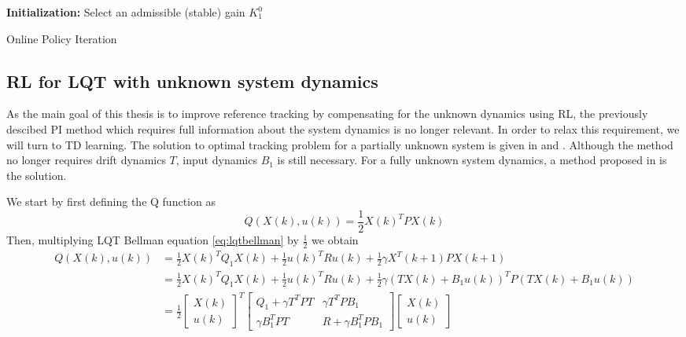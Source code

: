\begin{algorithm}[H]
	\textbf{Initialization:} Select an admissible (stable) gain $K^0_1$\\
	\label{alg:on_pi}
	\caption{Online Policy Iteration}
\end{algorithm}

\subsection{\acs{RL} for \acs{LQT} with unknown system dynamics}
As the main goal of this thesis is to improve reference tracking by compensating for the unknown dynamics using \acs {RL}, the previously descibed \acs {PI} method which requires full information about the system dynamics is no longer relevant. In order to relax this requirement, we will turn to \acs {TD} learning. The solution to optimal tracking problem for a partially unknown system is given in \cite{Kiumarsi6760476} \cite{Kiumarsi6918527} and \cite{Modares20141780}. Although the method no longer requires drift dynamics $T$, input dynamics $B_1$ is still necessary. For a fully unknown system dynamics, a method proposed in \cite{Kiumarsi20141167} is the solution. 

We start by first defining the Q function as 
\begin{equation}
Q(X(k), u(k)) = \frac{1}{2}X(k)^TPX(k) 
\end{equation}
Then, multiplying \acs{LQT} Bellman equation \eqref{eq:lqtbellman} by $ \frac{1}{2} $ we obtain
\begin{equation}
\begin{split}
Q(X(k), u(k)) &= \frac{1}{2}X(k)^TQ_1X(k) + \frac{1}{2}u(k)^TRu(k) + \frac{1}{2}\gamma X^T(k+1)PX(k+1) \\
&= \frac{1}{2}X(k)^TQ_1X(k) + \frac{1}{2}u(k)^TRu(k) + \frac{1}{2}\gamma (TX(k) + B_1u(k))^TP(TX(k) + B_1u(k)) \\
&= \frac{1}{2}\left[  \begin{array}{c}
X(k) \\ 
u(k)
\end{array} \right] ^T \left[\begin{array}{cc}
Q_1+\gamma T^TPT & \gamma T^TPB_1 \\ 
\gamma B_1^TPT & R+\gamma B_1^TPB_1
\end{array}  \right] 
\left[  \begin{array}{c}
X(k) \\ 
u(k)
\end{array} \right] 
\end{split}
\label{eq:bellman_Q}
\end{equation}

